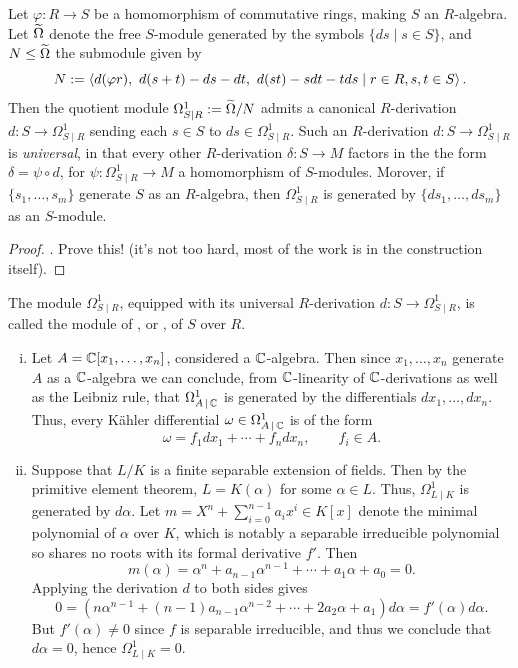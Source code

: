 \begin{prop}
	Let $\varphi:R \to S$ be a homomorphism of commutative rings, making $S$ an $R$-algebra. Let $\widetilde{\Omega}$ denote the free $S$-module generated by the symbols $\{ds \mid s \in S\}$, and $N \leq \widetilde{\Omega}$ the submodule given by 
	\[
		N := \left\langle d(\varphi r),\,\, d(s+t) - ds -dt,\,\, d(st) - s dt - t ds \mid r \in R, s,t \in S\right\rangle.
	\]
	Then the quotient module $\Omega^1_{S\mid R} := \widetilde{\Omega} / N$ admits a canonical $R$-derivation $d : S \to \Omega^1_{S\mid R}$ sending each $s \in S$ to $ds \in \Omega^1_{S\mid R}$. Such an $R$-derivation $d: S \to \Omega^1_{S \mid R}$ is \emph{universal}, in that every other $R$-derivation $\delta : S \to M$ factors in the the form $\delta = \psi \circ d$, for $\psi : \Omega^1_{S \mid R} \to M$ a homomorphism of $S$-modules. Morover, if $\{s_1, \ldots, s_m\}$ generate $S$ as an $R$-algebra, then $\Omega^1_{S \mid R}$ is generated by $\{ds_1, \ldots, ds_m\}$ as an $S$-module.
\end{prop}
\begin{proof}
	\Exc. Prove this! (it's not too hard, most of the work is in the construction itself).
\end{proof}

\begin{defn}
	The module $\Omega^1_{S \mid R}$, equipped with its universal $R$-derivation $d : S \to \Omega^1_{S \mid R}$, is called the module of , or , of $S$ over $R$.
\end{defn}

\begin{eg}
	\label{eg:kahler_differentials_rings}
	\begin{enumerate}[(i)]
		\item Let $A = \mathbb{C}[x_1, \ldots, x_n]$, considered a $\mathbb{C}$-algebra. Then since $x_1, \ldots, x_n$ generate $A$ as a $\mathbb{C}$-algebra we can conclude, from $\mathbb{C}$-linearity of $\mathbb{C}$-derivations as well as the Leibniz rule, that $\Omega^1_{A \, \mid \, \mathbb{C}}$ is generated by the differentials $dx_1, \ldots, dx_n$. Thus, every K\"ahler differential $\omega \in \Omega^1_{A\, \mid\, \mathbb{C}}$ is of the form 
		\[
			\omega = f_1 dx_1 + \cdots + f_n dx_n, \qquad f_i \in A. 
		\]
		\item Suppose that $L/K$ is a finite separable extension of fields. Then by the primitive element theorem, $L = K(\alpha)$ for some $\alpha \in L$. Thus, $\Omega^1_{L \mid K}$ is generated by $d \alpha$. Let $m = X^n + \sum_{i=0}^{n-1}a_i x^i \in K[x]$ denote the minimal polynomial of $\alpha$ over $K$, which is notably a separable irreducible polynomial so shares no roots with its formal derivative $f'$. Then 
		\[
			m(\alpha) = \alpha^n + a_{n-1}\alpha^{n-1} + \cdots + a_1 \alpha + a_0 = 0.
		\]
		Applying the derivation $d$ to both sides gives 
		\[
			0 = (n\alpha^{n-1} + (n-1)a_{n-1}\alpha^{n-2} + \cdots + 2 a_2\alpha + a_1)d\alpha = f'(\alpha)d\alpha.
		\]
		But $f'(\alpha) \neq 0$ since $f$ is separable irreducible, and thus we conclude that $d\alpha = 0$, hence $\Omega^1_{L \mid K}=0$. \qedhere
	\end{enumerate}
\end{eg}

